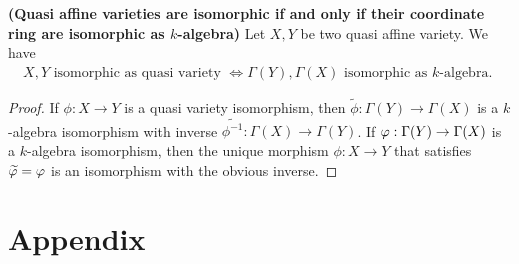 \documentclass{report}
\begin{document}
\begin{corollary}
\textbf{(Quasi affine varieties are isomorphic if and only if their coordinate ring are isomorphic as $k$-algebra)} Let $X,Y$ be two quasi affine variety. We have 
 \begin{align*}
X,Y\text{ isomorphic as quasi variety }\iff \Gamma (Y),\Gamma (X)\text{ isomorphic as $k$-algebra. }
\end{align*}
\end{corollary}
\begin{proof}
If $\phi:X\rightarrow Y$ is a quasi variety isomorphism, then  $\tilde{\phi}:\Gamma (Y)\rightarrow \Gamma (X)$ is a $k$-algebra isomorphism with inverse $\tilde{\phi^{-1}}:\Gamma (X)\rightarrow \Gamma (Y)$. If $\pfi: \Gamma (Y)\rightarrow \Gamma (X)$ is a $k$-algebra isomorphism, then the unique morphism  $\phi: X\rightarrow Y $ that satisfies $\tilde{\phi}=\pfi$ is an isomorphism with the obvious inverse.  
\end{proof}
\chapter{Appendix}
\end{document}
